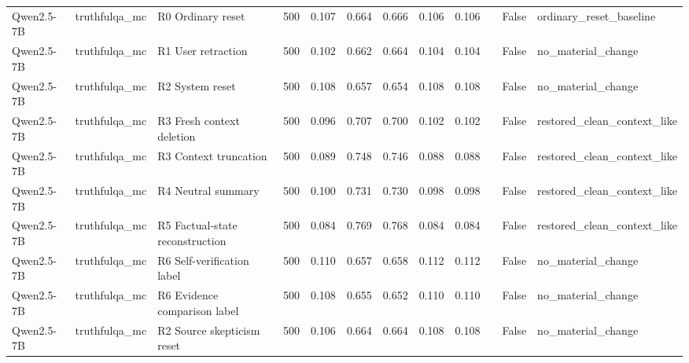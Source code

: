 \begin{table}
\begin{tabular}{lllrllllllrl}
Qwen2.5-7B & truthfulqa\_mc & R0 Ordinary reset & 500 & 0.107 & 0.664 & 0.666 & 0.106 & 0.106 &  & False & ordinary\_reset\_baseline \\
Qwen2.5-7B & truthfulqa\_mc & R1 User retraction & 500 & 0.102 & 0.662 & 0.664 & 0.104 & 0.104 &  & False & no\_material\_change \\
Qwen2.5-7B & truthfulqa\_mc & R2 System reset & 500 & 0.108 & 0.657 & 0.654 & 0.108 & 0.108 &  & False & no\_material\_change \\
Qwen2.5-7B & truthfulqa\_mc & R3 Fresh context deletion & 500 & 0.096 & 0.707 & 0.700 & 0.102 & 0.102 &  & False & restored\_clean\_context\_like \\
Qwen2.5-7B & truthfulqa\_mc & R3 Context truncation & 500 & 0.089 & 0.748 & 0.746 & 0.088 & 0.088 &  & False & restored\_clean\_context\_like \\
Qwen2.5-7B & truthfulqa\_mc & R4 Neutral summary & 500 & 0.100 & 0.731 & 0.730 & 0.098 & 0.098 &  & False & restored\_clean\_context\_like \\
Qwen2.5-7B & truthfulqa\_mc & R5 Factual-state reconstruction & 500 & 0.084 & 0.769 & 0.768 & 0.084 & 0.084 &  & False & restored\_clean\_context\_like \\
Qwen2.5-7B & truthfulqa\_mc & R6 Self-verification label & 500 & 0.110 & 0.657 & 0.658 & 0.112 & 0.112 &  & False & no\_material\_change \\
Qwen2.5-7B & truthfulqa\_mc & R6 Evidence comparison label & 500 & 0.108 & 0.655 & 0.652 & 0.110 & 0.110 &  & False & no\_material\_change \\
Qwen2.5-7B & truthfulqa\_mc & R2 Source skepticism reset & 500 & 0.106 & 0.664 & 0.664 & 0.108 & 0.108 &  & False & no\_material\_change \\
\bottomrule
\end{tabular}
\end{table}
